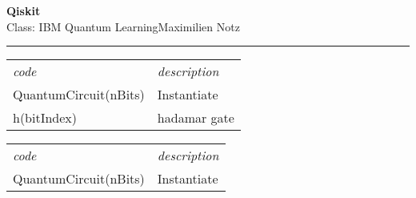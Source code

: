 \documentclass[5pt]{article}
\begin{document}
\begin{center}
     \Large{\textbf{Qiskit}}\\
     \small{Class: IBM Quantum Learning}\hfill\small{\textcopyright Maximilien Notz \the\year{}}
     \noindent\rule{20cm}{0.4pt}
\end{center}
\begin{multicols}{2}
\setcounter{secnumdepth}{0}


\begin{tabular}{ll}
\emph{code}           & \emph{description}\\
QuantumCircuit(nBits) & Instantiate \\
h(bitIndex)           & hadamar gate
\end{tabular}

\begin{tabular}{ll}
\emph{code} & \emph{description}\\
QuantumCircuit(nBits) & Instantiate 
     
\end{tabular}



\end{multicols}
\end{document}
